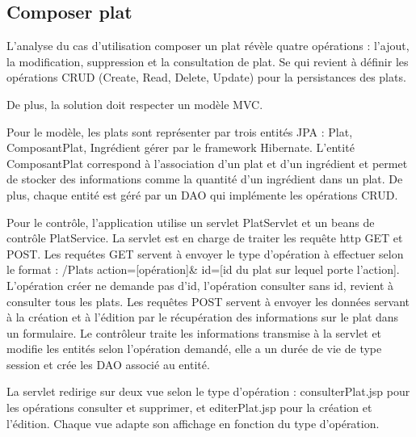 \subsection{Composer plat}

L'analyse du cas d'utilisation composer un plat révèle quatre opérations : l'ajout, la modification, suppression et la consultation de plat. Se qui revient à définir les opérations CRUD (Create, Read, Delete, Update) pour la persistances des plats.

De plus, la solution doit respecter un modèle MVC.

Pour le modèle, les plats sont représenter par trois entités JPA : Plat, ComposantPlat, Ingrédient gérer par le framework Hibernate. L'entité ComposantPlat correspond à l'association d'un plat et d'un ingrédient et permet de stocker des informations comme la quantité d'un ingrédient dans un plat. De plus, chaque entité est géré par un DAO qui implémente les opérations CRUD.

Pour le contrôle, l'application utilise un servlet PlatServlet et un beans de contrôle PlatService.
La servlet est en charge de traiter les requête http GET et POST. Les requétes GET servent à envoyer le type d'opération à effectuer selon le format : /Plats\? action=[opération]\& id=[id du plat sur lequel porte l'action]. L'opération créer ne demande pas d'id, l'opération consulter sans id, revient à consulter tous les plats.
Les requêtes POST servent à envoyer les données servant à la création et à l'édition par le récupération des informations sur le plat dans un formulaire.
Le contrôleur traite les informations transmise à la servlet et modifie les entités selon l'opération demandé, elle a un durée de vie de type session et crée les DAO associé au entité.

La servlet redirige sur deux vue selon le type d'opération : consulterPlat.jsp pour les opérations consulter et supprimer, et editerPlat.jsp pour la création et l'édition. Chaque vue adapte son affichage en fonction du type d'opération. 

